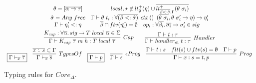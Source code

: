 \documentclass[acmsmall,review,screen]{acmart}
\newcommand{\mathframebox}[1]{\framebox{$\displaystyle #1$}}
\newcommand{\ap}{~}
\newcommand{\ctx}[1]{ctx\left(#1\right)~}
\begin{document}
\begin{figure}
\begin{gather*}
{\begin{array}{cc}
                \theta = [\overline{\alpha\to\tau}]
                &
                local, \star \not\in lt_\emptyset^+(\eta)\cup\overline{lt_{\overline{\beta <: \hat{\sigma}}, \Gamma}^+(\theta\ap\sigma_i)}
                \\
                \hat{\sigma} = Any\ap free
                &
                \Gamma\vdash\theta\ap t_i : \forall \overline{(\beta <: \hat{\sigma})}\ldotp \ctx{} (\overline{\theta\ap\sigma_i}, \theta\ap\sigma_i'\to\eta)\to\eta_i'
                \\
                \Gamma\vdash\eta_i' <: \eta
                &
                \begin{array}{cc}
                    \overline{\beta}\cap ftv(\eta_i') = \emptyset
                    &
                    op_i : \forall\overline{\beta_i}\ldotp \overline{\sigma_i}\to\sigma'_i \in sig
                \end{array}
            \end{array}
        }\\
        \infer[Cap]{
            \Gamma\vdash K_{cap}\ap\overline{\tau}\ap m\ap h : T\ap local \ap\overline{\tau}
        }{
            K_{cap} : \forall\overline{\alpha}\ldotp sig\to T\ap local\ap\overline{\alpha} \in \Sigma
        }
        \hspace{2em}
        \infer[Handler]{
            \Gamma\vdash handler_m ~t : \tau
        }{
            \Gamma\vdash t : \tau
        }\\
        \begin{array}{ccccc}
            \mathframebox{\Gamma\vdash_{\overline{x}}\overline{\tau}} &
            \infer[TypesOf]{\Gamma\vdash_{\overline{x}}\overline{s}}{\overline{x :_\cdot s} \subset \Gamma} &
            \mathframebox{\Gamma\vdash p} &
            \infer[\epsilon Prog]{\Gamma\vdash\epsilon}{} &
            \infer[Prog]{
                \Gamma\vdash x : s = t, p
            }{
                \Gamma\vdash t : s &
                flt(s)\cup ftv(s) = \emptyset &
                \Gamma\vdash p
            }
        \end{array}
    \end{gather*}
    \caption{Typing rules for $Core_{\Delta}$.}
    \label{fig:core-delta-typing}
\end{figure}
\end{document}
